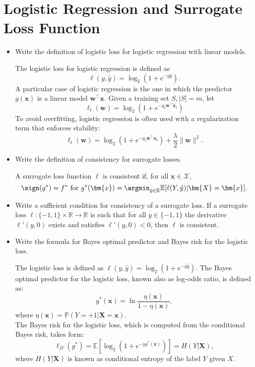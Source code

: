 \newpage
\section{Logistic Regression and Surrogate Loss Function}

\begin{itemize}

    \item Write the definition of logistic loss for logistic regression with linear models.

        The logistic loss for logistic regression is defined as
        $$\ell(y, \hat{y}) = \log_2 (1+e^{-y\hat{y}}).$$
        A particular case of logistic regression is the one in which the predictor $g(\bm{x})$ is a linear model $\bm{w}^\top \bm{x}$. Given a training set $S, |S|=m$, let 
        $$\ell_t (\bm{w}) = \log_2 (1+e^{-y_t \bm{w}^\top \bm{x}_t})$$
        To avoid overfitting, logistic regression is often used with a regularization term that enforces stability:
        $$\ell_t (\bm{w}) = \log_2 (1+e^{-y_t \bm{w}^\top \bm{x}_t}) + \frac{\lambda}{2} \|\bm{w}\|^2.$$

  \item Write the definition of consistency for surrogate losses.

        A surrogate loss function $\ell$ is consistent if, for all $\bm{x} \in \mathcal{X}$,
        $$\sign (g^*) = f^* \text{ for } g^*(\bm{x}) = \argmin_{\hat{y} \in \mathbb{R}} \mathbb{E}[\ell(Y,\hat{y})|\bm{X} = \bm{x}].$$

  \item Write a sufficient condition for consistency of a surrogate loss.
        If a surrogate loss $\ell:\{-1,1\} \times \mathbb{R} \to \mathbb{R}$ is such that for all $y \in \{-1,1\}$ the derivative $\ell'(y,0)$ exists and satisfies $\ell'(y,0) < 0$, then $\ell$ is consistent.

  \item Write the formula for Bayes optimal predictor and Bayes risk for the logistic loss.

        The logistic loss is defined as $\ell(y, \hat{y}) = \log_2 (1 + e^{-y\hat{y}})$. The Bayes optimal predictor for the logistic loss, known also as log-odds ratio, is defined as:
        $$g^*(\bm{x}) = \ln \frac{\eta(\bm{x})}{1-\eta(\bm{x})},$$
        where $\eta(\bm{x}) = \mathbb{P} (Y=+1|\bm{X} = \bm{x})$.\\
        The Bayes risk for the logistic loss, which is computed from the conditional Bayes risk, takes form:
        $$\ell_D (g^*) = \mathbb{E}[\log_2(1+e^{-yg^*(\bm{x})})] = H(Y|\bm{X}),$$
        where $H(Y|\bm{X})$ is known as conditional entropy of the label $Y$ given $X$.

\end{itemize}
